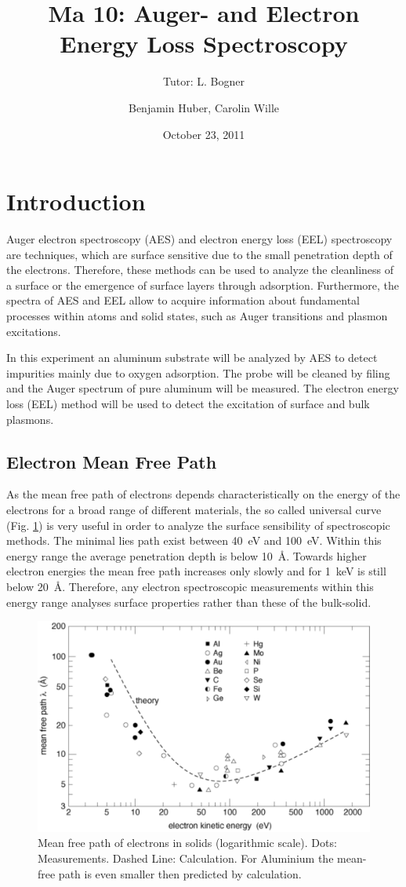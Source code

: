 \documentclass[a4paper]{scrartcl}
\title{Ma 10: Auger- and Electron Energy Loss Spectroscopy}
\subtitle{Tutor: L. Bogner}
\author{Benjamin Huber, Carolin Wille}
\date{October 23, 2011}
\numberwithin{equation}{section}
\numberwithin{figure}{section}
\numberwithin{table}{section}
\begin{document}
\thispagestyle{empty}
\maketitle
\tableofcontents
\clearpage



\section{Introduction}
Auger electron spectroscopy (AES) and electron energy loss (EEL) spectroscopy are techniques, which are surface sensitive due to the small penetration depth of the electrons. Therefore, these methods can be used to analyze the cleanliness of a surface or the emergence of surface layers through adsorption. Furthermore, the spectra of AES and EEL allow to acquire information about fundamental processes within atoms and solid states, such as Auger transitions and plasmon excitations.  

In this experiment an aluminum substrate will be analyzed by AES to detect impurities mainly due to oxygen adsorption. The probe will be cleaned by filing and the Auger spectrum of pure aluminum will be measured. The electron energy loss (EEL) method will be used to detect the excitation of surface and bulk plasmons.


\subsection{Electron Mean Free Path}
As the mean free path of electrons depends characteristically on the energy of the electrons for a broad range of different materials, the so called universal curve (Fig. \ref{mf}) is very useful in order to analyze the surface sensibility of spectroscopic methods. The minimal lies path exist between \SI{40}{eV} and \SI{100}{eV}. Within this energy range the average penetration depth is below \SI{10}{\AA}. Towards higher electron energies the mean free path increases only slowly and for \SI{1}{keV} is still below \SI{20}{\AA}. Therefore, any electron spectroscopic measurements within this energy range analyses surface properties rather than these of the bulk-solid. 
\begin{figure}[htbp]
\centering
\includegraphics[width=0.5 \textwidth]{meanfree.pdf}
\caption{\small Mean free path of electrons in solids (logarithmic scale). Dots: Measurements. Dashed Line: Calculation. For Aluminium the mean-free path is even smaller then predicted by calculation. \cite{zangwill} }
\label{mf}
\end{figure}
\end{document}
